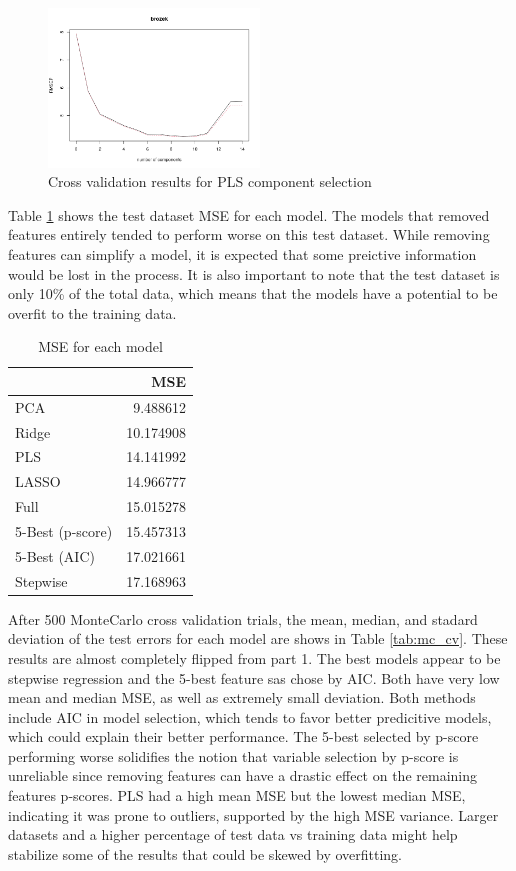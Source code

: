 \documentclass[12pt,letterpaper]{article}
\begin{document}
\begin{figure}[h!]
  \centering
  \includegraphics[width=0.5\textwidth]{pls_rmsep}
  \caption{Cross validation results for PLS component selection}
  \label{fig:pls}
\end{figure}

Table \ref{tab:part1} shows the test dataset MSE for each model. The models that removed features entirely tended to perform worse on this test dataset. While removing features can simplify a model, it is expected that some preictive information would be lost in the process. It is also important to note that the test dataset is only 10\% of the total data, which means that the models have a potential to be overfit to the training data.

\begin{table}
  \caption{MSE for each model}
  \centering
  \begin{tabular}[h!]{|l|r|}
  \hline
    & MSE\\
  \hline
  PCA & 9.488612\\
  \hline
  Ridge & 10.174908\\
  \hline
  PLS & 14.141992\\
  \hline
  LASSO & 14.966777\\
  \hline
  Full & 15.015278\\
  \hline
  5-Best (p-score) & 15.457313\\
  \hline
  5-Best (AIC) & 17.021661\\
  \hline
  Stepwise & 17.168963\\
  \hline
  \end{tabular}
  \label{tab:part1}
\end{table}

After 500 MonteCarlo cross validation trials, the mean, median, and stadard deviation of the test errors for each model are shows in Table \ref{tab:mc_cv}. These results are almost completely flipped from part 1. The best models appear to be stepwise regression and the 5-best feature sas chose by AIC. Both have very low mean and median MSE, as well as extremely small deviation. Both methods include AIC in model selection, which tends to favor better predicitive models, which could explain their better performance. The 5-best selected by p-score performing worse solidifies the notion that variable selection by p-score is unreliable since removing features can have a drastic effect on the remaining features p-scores. PLS had a high mean MSE but the lowest median MSE, indicating it was prone to outliers, supported by the high MSE variance. Larger datasets and a higher percentage of test data vs training data might help stabilize some of the results that could be skewed by overfitting. 
\end{document}
